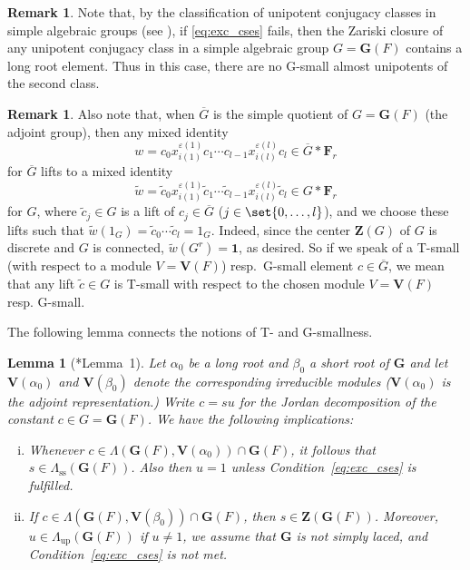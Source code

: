 \documentclass[a4paper,12pt]{amsproc}
\theoremstyle{plain}
\newtheorem{lemma}[definition]{Lemma}
\theoremstyle{definition}
\newtheorem{remark}[definition]{Remark}
\begin{document}
\begin{remark}\label{rmk:conj_cls_rt_elts}
Note that, by the classification of unipotent conjugacy classes in simple algebraic groups (see \cite{spaltenstein2006classes}), if \eqref{eq:exc_cses} fails, then the Zariski closure of any unipotent conjugacy class in a simple algebraic group $G=\mathbf{G}(F)$ contains a long root element. Thus in this case, there are no G-small almost unipotents of the second class.
\end{remark}

\begin{remark}\label{rmk:lift_mxd_ids}
Also note that, when $\overline{G}$ is the simple quotient of $G=\mathbf{G}(F)$ (the adjoint group), then any mixed identity $$w=c_0 x_{i(1)}^{\varepsilon(1)}c_1\cdots c_{l-1} x_{i(l)}^{\varepsilon(l)}c_l\in\overline{G}\ast\mathbf{F}_r$$ for $\overline{G}$ lifts to a mixed identity $$\widetilde{w}=\widetilde{c}_0 x_{i(1)}^{\varepsilon(1)}\widetilde{c}_1\cdots \widetilde{c}_{l-1} x_{i(l)}^{\varepsilon(l)}\widetilde{c}_l\in G\ast\mathbf{F}_r$$ for $G$, where $\widetilde{c}_j\in G$ is a lift of $c_j\in\overline{G}$ ($j\in\set{0,\ldots,l}$), and we choose these lifts such that $\widetilde{w}(1_G)=\widetilde{c}_0\cdots\widetilde{c}_l=1_G$. Indeed, since the center $\mathbf{Z}(G)$ of $G$ is discrete and $G$ is connected, $\widetilde{w}(G^r)=\mathbf{1}$, as desired. So if we speak of a T-small (with respect to a module $V=\mathbf{V}(F)$) resp.\ G-small element $c\in\overline{G}$, we mean that any lift $\widetilde{c}\in G$ is T-small with respect to the chosen module $V=\mathbf{V}(F)$ resp. G-small. 
\end{remark}

The following lemma connects the notions of T- and G-smallness.
	
\begin{lemma}[\cite{gordeev1997freedom}*{Lemma~1}]\label{lem:gordeev_conn_sml_consts}
Let $\alpha_0$ be a long root and $\beta_0$ a short root of $\mathbf{G}$ and let $\mathbf{V}(\alpha_0)$ and $\mathbf{V}(\beta_0)$ denote the corresponding irreducible modules ($\mathbf{V}(\alpha_0)$ is the adjoint representation.) Write $c=su$ for the Jordan decomposition of the constant $c\in G=\mathbf{G}(F)$. We have the following implications:
\begin{enumerate}[(i)]
\item Whenever $c\in\Lambda(\mathbf{G}(F),\mathbf{V}(\alpha_0))\cap\mathbf{G}(F)$, it follows that $s\in\Lambda_{\text{ss}}(\mathbf{G}(F))$. Also then $u=1$ unless Condition~\eqref{eq:exc_cses} is fulfilled. 
\item If $c\in\Lambda(\mathbf{G}(F),\mathbf{V}(\beta_0))\cap\mathbf{G}(F)$, then $s\in\mathbf{Z}(\mathbf{G}(F))$. Moreover, $u\in\Lambda_{\text{up}}(\mathbf{G}(F))$ if $u\neq 1$, we assume that $\mathbf{G}$ is not simply laced, and Condition~\eqref{eq:exc_cses} is not met.
\end{enumerate}
\end{lemma}
	
\end{document}
